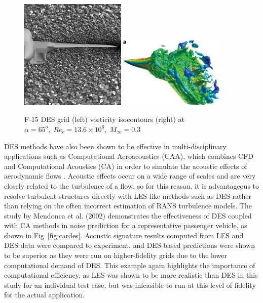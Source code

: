 \documentclass[journal]{new-aiaa}
\begin{document}
\begin{figure}[H]
\begin{center}
\includegraphics[width=0.45\textwidth]{Images/logan/forsythe2004detachededdy_f15grid.pdf}
\includegraphics[width=0.45\textwidth]{Images/logan/spalart2009detachededdy_f15des.pdf}
\caption{ F-15 DES grid (left) \cite{forsythe2004detachededdy} vorticity isocontours (right) at $\alpha=65^o, \; Re_c=13.6\times10^6, \; M_{\infty}=0.3$ \cite{spalart2009detachededdy} }
\label{fig:f15des}
\end{center}
\end{figure}





DES methods have also been shown to be effective in multi-disciplinary applications such as Computational Aeroacoustics (CAA), which combines CFD and Computational Acoustics (CA) in order to simulate the acoustic effects of aerodynamic flows \cite{mendonca2002towards}. Acoustic effects occur on a wide range of scales and are very closely related to the turbulence of a flow, so for this reason, it is advantageous to resolve turbulent structures directly with LES-like methods such as DES rather than relying on the often incorrect estimation of RANS turbulence models. The study by Mendonca et al. (2002) demonstrates the effectiveness of DES coupled with CA methods in noise prediction for a representative passenger vehicle, as shown in Fig~\ref{fig:cardes}. Acoustic signature results computed from LES and DES data were compared to experiment, and DES-based predictions were shown to be superior as they were run on higher-fidelity grids due to the lower computational demand of DES. This example again highlights the importance of computational efficiency, as LES was shown to be more realistic than DES in this study for an individual test case, but was infeasible to run at this level of fidelity for the actual application.
\end{document}
